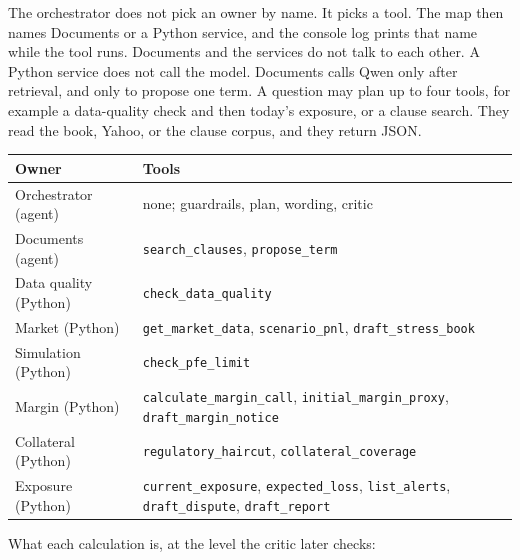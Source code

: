 \documentclass[11pt,a4paper]{article}
\begin{document}
The orchestrator does not pick an owner by name. It picks a tool. The map then names Documents or a Python service, and the console log prints that name while the tool runs. Documents and the services do not talk to each other. A Python service does not call the model. Documents calls Qwen only after retrieval, and only to propose one term. A question may plan up to four tools, for example a data-quality check and then today's exposure, or a clause search. They read the book, Yahoo, or the clause corpus, and they return JSON.

\begin{center}
\begin{tabular}{@{}lp{9.6cm}@{}}
\toprule
Owner & Tools \\
\midrule
Orchestrator (agent) & none; guardrails, plan, wording, critic \\
Documents (agent) & \texttt{search\_clauses}, \texttt{propose\_term} \\
Data quality (Python) & \texttt{check\_data\_quality} \\
Market (Python) & \texttt{get\_market\_data}, \texttt{scenario\_pnl}, \texttt{draft\_stress\_book} \\
Simulation (Python) & \texttt{check\_pfe\_limit} \\
Margin (Python) & \texttt{calculate\_margin\_call}, \texttt{initial\_margin\_proxy}, \texttt{draft\_margin\_notice} \\
Collateral (Python) & \texttt{regulatory\_haircut}, \texttt{collateral\_coverage} \\
Exposure (Python) & \texttt{current\_exposure}, \texttt{expected\_loss}, \texttt{list\_alerts}, \texttt{draft\_dispute}, \texttt{draft\_report} \\
\bottomrule
\end{tabular}
\end{center}

What each calculation is, at the level the critic later checks:
\end{document}
